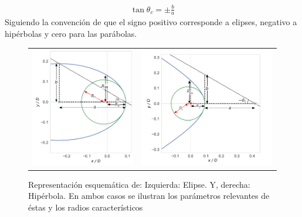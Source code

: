 \begin{align}
  \tan\theta_c = \pm \frac{b}{a} \label{eq:thc}
\end{align}
Siguiendo la convención de que el signo positivo corresponde a elipses, negativo a
hipérbolas y cero para las parábolas.

\begin{figure}
  \begin{tabular}{cc}
    \includegraphics[width=0.5\linewidth]{./Figures/ellipse_edited} &
    \includegraphics[width=0.5\linewidth]{./Figures/hyperbola_edited}
  \end{tabular}
  \label{fig:conics}
  \caption{Representación esquemática de: Izquierda: Elipse. Y, derecha: Hipérbola.
  En ambos casos se ilustran los parámetros relevantes de éstas y los radios característicos}
\end{figure}

